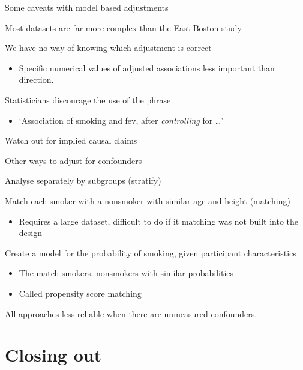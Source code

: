 \documentclass[ignorenonframetext,]{beamer}
\begin{document}
\begin{frame}{Some caveats with model based adjustments}

Most datasets are far more complex than the East Boston study

We have no way of knowing which adjustment is correct

\begin{itemize}
\itemsep1pt\parskip0pt
\item
  Specific numerical values of adjusted associations less important than
  direction.
\end{itemize}

Statisticians discourage the use of the phrase

\begin{itemize}
\itemsep1pt\parskip0pt
\item
  `Association of smoking and fev, after \emph{controlling} for
  \ldots{}'
\end{itemize}

Watch out for implied causal claims

\end{frame}

\begin{frame}{Other ways to adjust for confounders}

Analyse separately by subgroups (stratify)

Match each smoker with a nonsmoker with similar age and height
(matching)

\begin{itemize}
\itemsep1pt\parskip0pt
\item
  Requires a large dataset, difficult to do if it matching was not built
  into the design
\end{itemize}

Create a model for the probability of smoking, given participant
characteristics

\begin{itemize}
\item
  The match smokers, nonsmokers with similar probabilities
\item
  Called propensity score matching
\end{itemize}

All approaches less reliable when there are unmeasured confounders.

\end{frame}

\section{Closing out}\label{closing-out}
\end{document}
